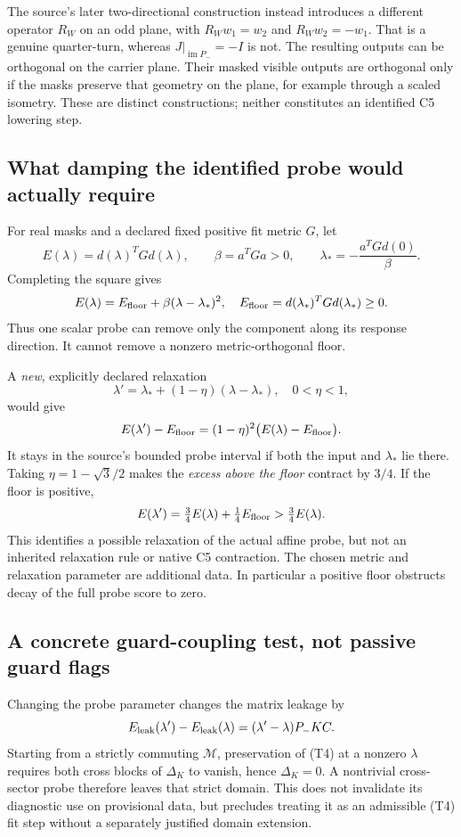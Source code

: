 \documentclass[11pt,a4paper]{article}
\begin{document}
The source's later two-directional construction instead introduces a
different operator $R_W$ on an odd plane, with
$R_Ww_1=w_2$ and $R_Ww_2=-w_1$. That is a genuine quarter-turn, whereas
$J|_{\operatorname{im}P_-}=-I$ is not. The resulting outputs can be
orthogonal on the carrier plane. Their masked visible outputs are
orthogonal only if the masks preserve that geometry on the plane, for
example through a scaled isometry. These are distinct constructions;
neither constitutes an identified C5 lowering step.

\subsection{What damping the identified probe would actually require}
For real masks and a declared fixed positive fit metric $G$, let
\[
 E(\lambda)=d(\lambda)^TGd(\lambda),\qquad
 \beta=a^TGa>0,\qquad
 \lambda_*=-\frac{a^TGd(0)}{\beta}.
\]
Completing the square gives
\[
 E(\lambda)=E_{\rm floor}+\beta(\lambda-\lambda_*)^2,
 \quad E_{\rm floor}=d(\lambda_*)^TGd(\lambda_*)\ge0.
\]
Thus one scalar probe can remove only the component along its response
direction. It cannot remove a nonzero metric-orthogonal floor.

A \emph{new}, explicitly declared relaxation
\[
 \lambda'=\lambda_*+(1-\eta)(\lambda-\lambda_*),\quad 0<\eta<1,
\]
would give
\[
 E(\lambda')-E_{\rm floor}
 =(1-\eta)^2\bigl(E(\lambda)-E_{\rm floor}\bigr).
\]
It stays in the source's bounded probe interval if both the input and
$\lambda_*$ lie there. Taking $\eta=1-\sqrt3/2$ makes the
\emph{excess above the floor} contract by $3/4$. If the floor is positive,
\[
 E(\lambda')=\tfrac34 E(\lambda)+\tfrac14 E_{\rm floor}
 >\tfrac34 E(\lambda).
\]
This identifies a possible relaxation of the actual affine probe, but
not an inherited relaxation rule or native C5 contraction. The chosen
metric and relaxation parameter are additional data. In particular a
positive floor obstructs decay of the full probe score to zero.

\subsection{A concrete guard-coupling test, not passive guard flags}
Changing the probe parameter changes the matrix leakage by
\[
 E_{\rm leak}(\lambda')-E_{\rm leak}(\lambda)
 =(\lambda'-\lambda)P_-KC.
\]
Starting from a strictly commuting $\mathcal M$, preservation of (T4)
at a nonzero $\lambda$ requires both cross blocks of $\Delta_K$ to
vanish, hence $\Delta_K=0$. A nontrivial cross-sector probe therefore
leaves that strict domain. This does not invalidate its diagnostic use
on provisional data, but precludes treating it as an admissible (T4)
fit step without a separately justified domain extension.
\end{document}
